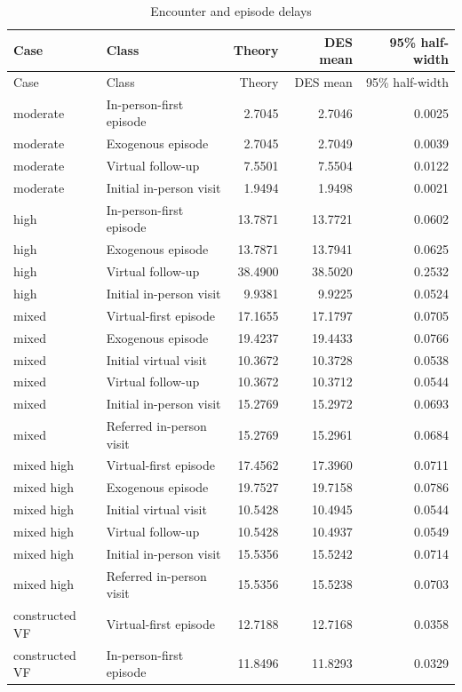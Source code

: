 \begin{longtable}{llrrr}
\caption{Encounter and episode delays}\label{tab:delaydetails}\\
\toprule Case & Class & Theory & DES mean & 95\% half-width\\\midrule\endfirsthead
\toprule Case & Class & Theory & DES mean & 95\% half-width\\\midrule\endhead
moderate & In-person-first episode & 2.7045 & 2.7046 & 0.0025\\
moderate & Exogenous episode & 2.7045 & 2.7049 & 0.0039\\
moderate & Virtual follow-up & 7.5501 & 7.5504 & 0.0122\\
moderate & Initial in-person visit & 1.9494 & 1.9498 & 0.0021\\
high & In-person-first episode & 13.7871 & 13.7721 & 0.0602\\
high & Exogenous episode & 13.7871 & 13.7941 & 0.0625\\
high & Virtual follow-up & 38.4900 & 38.5020 & 0.2532\\
high & Initial in-person visit & 9.9381 & 9.9225 & 0.0524\\
mixed & Virtual-first episode & 17.1655 & 17.1797 & 0.0705\\
mixed & Exogenous episode & 19.4237 & 19.4433 & 0.0766\\
mixed & Initial virtual visit & 10.3672 & 10.3728 & 0.0538\\
mixed & Virtual follow-up & 10.3672 & 10.3712 & 0.0544\\
mixed & Initial in-person visit & 15.2769 & 15.2972 & 0.0693\\
mixed & Referred in-person visit & 15.2769 & 15.2961 & 0.0684\\
mixed high & Virtual-first episode & 17.4562 & 17.3960 & 0.0711\\
mixed high & Exogenous episode & 19.7527 & 19.7158 & 0.0786\\
mixed high & Initial virtual visit & 10.5428 & 10.4945 & 0.0544\\
mixed high & Virtual follow-up & 10.5428 & 10.4937 & 0.0549\\
mixed high & Initial in-person visit & 15.5356 & 15.5242 & 0.0714\\
mixed high & Referred in-person visit & 15.5356 & 15.5238 & 0.0703\\
constructed VF & Virtual-first episode & 12.7188 & 12.7168 & 0.0358\\
constructed VF & In-person-first episode & 11.8496 & 11.8293 & 0.0329\\

\end{longtable}
